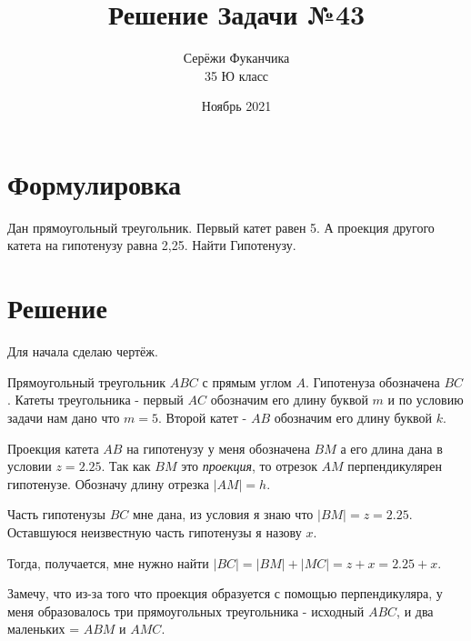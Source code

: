 \documentclass{article}
\title{Решение Задачи №43}
\author{Серёжи Фуканчика\\35 Ю класс}
\date{Ноябрь 2021}
\begin{document}
\maketitle

\section{Формулировка}
Дан прямоугольный треугольник. Первый катет равен 5. А проекция другого катета на гипотенузу равна 2,25. Найти Гипотенузу. 

\section{Решение}
Для начала сделаю чертёж.


Прямоугольный треугольник $ABC$ с прямым углом $A$. Гипотенуза обозначена $BC$. Катеты треугольника - первый $AC$ обозначим его длину буквой $m$ и по условию задачи нам дано что $m=5$. Второй катет - $AB$ обозначим его длину буквой $k$.

Проекция катета $AB$  на гипотенузу у меня обозначена $BM$ а его длина дана в условии $z=2.25$. Так как $BM$ это \textit{проекция}, то отрезок $AM$ перпендикулярен гипотенузе. Обозначу длину отрезка $|AM|=h$. 

Часть гипотенузы $BC$ мне дана, из условия я знаю что $|BM|=z=2.25$. Оставшуюся неизвестную часть гипотенузы я назову $x$.

Тогда, получается, мне нужно найти $|BC|=|BM|+|MC|=z+x=2.25+x$.

Замечу, что из-за того что проекция образуется с помощью перпендикуляра, у меня образовалось три прямоугольных треугольника -  исходный $ABC$, и два маленьких = $ABM$ и $AMC$.
\end{document}
